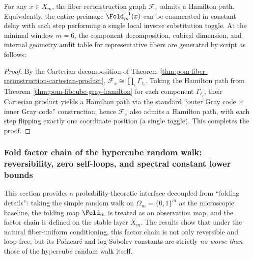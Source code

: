 \begin{corollary}\label{cor:pom-fiber-constant-delay-traversal}
For any \(x\in X_m\), the fiber reconstruction graph \(\mathcal F_x\) admits a Hamilton path.
Equivalently, the entire preimage \(\Fold_m^{-1}(x)\) can be enumerated in constant delay with each step performing a single local inverse substitution toggle.
At the minimal window \(m=6\), the component decomposition, cubical dimension, and internal geometry audit table for representative fibers are generated by script as follows:

\end{corollary}
\begin{proof}
By the Cartesian decomposition of Theorem \ref{thm:pom-fiber-reconstruction-cartesian-product},
\(
\mathcal F_x\cong \prod_i \Gamma_{\ell_i}
\).
Taking the Hamilton path from Theorem \ref{thm:pom-fibcube-gray-hamilton} for each component \(\Gamma_{\ell_i}\),
their Cartesian product yields a Hamilton path via the standard ``outer Gray code \(\times\) inner Gray code'' construction;
hence \(\mathcal F_x\) also admits a Hamilton path, with each step flipping exactly one coordinate position (a single toggle).
This completes the proof.
\end{proof}

\subsubsection{Fold factor chain of the hypercube random walk: reversibility, zero self-loops, and spectral constant lower bounds}\label{subsubsec:pom-fold-factor-chain}

This section provides a probability-theoretic interface decoupled from ``folding details'': taking the simple random walk on \(\Omega_m=\{0,1\}^m\) as the microscopic baseline,
the folding map \(\Fold_m\) is treated as an observation map, and the factor chain is defined on the stable layer \(X_m\).
The results show that under the natural fiber-uniform conditioning, this factor chain is not only reversible and loop-free,
but its Poincar\'e and log-Sobolev constants are strictly \emph{no worse than} those of the hypercube random walk itself.

